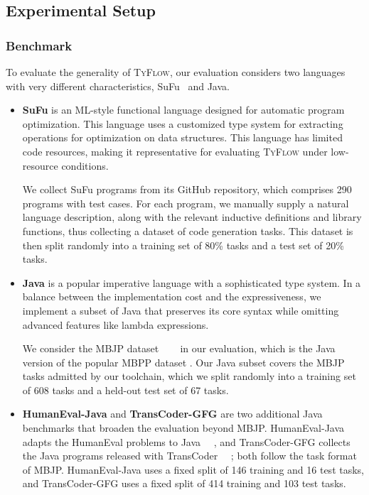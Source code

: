 \documentclass[manuscript,screen]{acmart}
\newcommand{\toolname}[1]{\textsc{#1}}
\newcommand{\mainname}{\toolname{TyFlow}\xspace}
\begin{document}
\subsection{Experimental Setup}

\subsubsection{Benchmark}
To evaluate the generality of \mainname, our evaluation considers two languages with very different characteristics, SuFu~\cite{DBLP:journals/pacmpl/JiZPXH24} and Java.
\begin{itemize}
 \item \textbf{SuFu} is an ML-style functional language designed for automatic program optimization. This language uses a customized type system for extracting operations for optimization on data structures.
 This language has limited code resources, making it representative for evaluating \mainname under low-resource conditions.

 We collect SuFu programs from its GitHub repository, which comprises 290 programs with test cases. For each program, we manually supply a natural language description, along with the relevant inductive definitions and library functions, thus collecting a dataset of code generation tasks.
 This dataset is then split randomly into a training set of 80\% tasks and a test set of 20\% tasks.

 \item \textbf{Java} is a popular imperative language with a sophisticated type system. In a balance between the implementation cost and the expressiveness, we implement a subset of Java that preserves its core syntax while omitting advanced features like lambda expressions.

 We consider the MBJP dataset {\color{revblue}~\mbox{%
\cite{DBLP:conf/iclr/AthiwaratkunGWL23} }\hskip0pt%
} in our evaluation, which is the Java version of the popular MBPP dataset  . Our Java subset covers    {\color{revblue}the MBJP tasks admitted by our toolchain, which we split } randomly into a training set of    {\color{revblue}608 } tasks and a  {\color{revblue}held-out } test set of    {\color{revblue}67 tasks.
}

 \item \textbf{\color{revblue}HumanEval-Java} {\color{revblue}and }\textbf{\color{revblue}TransCoder-GFG} {\color{revblue}are two additional Java benchmarks that broaden the evaluation beyond MBJP. HumanEval-Java adapts the HumanEval problems to Java~\mbox{%
\cite{DBLP:journals/corr/abs-2107-03374}}\hskip0pt%
, and TransCoder-GFG collects the Java programs released with TransCoder~\mbox{%
\cite{DBLP:conf/nips/LachauxROC20}}\hskip0pt%
; both follow the task format of MBJP. 
HumanEval-Java uses a fixed split of 146 training and 16 test tasks, and TransCoder-GFG uses a fixed split of 414 training and 103 test tasks.
} \end{itemize}
\end{document}

